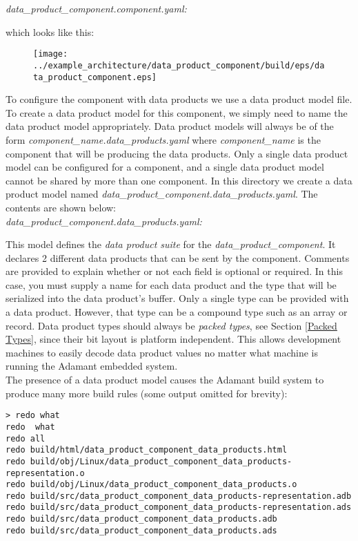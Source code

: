 \textit{data\_product\_component.component.yaml:}

which looks like this:

\begin{figure}[H]
  \texttt{[image: ../example\_architecture/data\_product\_component/build/eps/data\_product\_component.eps]}
\end{figure}

To configure the component with data products we use a data product model file. To create a data product model for this component, we simply need to name the data product model appropriately. Data product models will always be of the form \textit{component\_name.data\_products.yaml} where \textit{component\_name} is the component that will be producing the data products. Only a single data product model can be configured for a component, and a single data product model cannot be shared by more than one component. In this directory we create a data product model named \textit{data\_product\_component.data\_products.yaml}. The contents are shown below: \\

\textit{data\_product\_component.data\_products.yaml:}

This model defines the \textit{data product suite} for the \textit{data\_product\_component}. It declares 2 different data products that can be sent by the component. Comments are provided to explain whether or not each field is optional or required. In this case, you must supply a name for each data product and the type that will be serialized into the data product's buffer. Only a single type can be provided with a data product. However, that type can be a compound type such as an array or record. Data product types should always be \textit{packed types}, see Section \ref{Packed Types}, since their bit layout is platform independent. This allows development machines to easily decode data product values no matter what machine is running the Adamant embedded system. \\

The presence of a data product model causes the Adamant build system to produce many more build rules (some output omitted for brevity):

\vspace{5mm} %
\begin{verbatim}
> redo what 
redo  what
redo all
redo build/html/data_product_component_data_products.html
redo build/obj/Linux/data_product_component_data_products-representation.o
redo build/obj/Linux/data_product_component_data_products.o
redo build/src/data_product_component_data_products-representation.adb
redo build/src/data_product_component_data_products-representation.ads
redo build/src/data_product_component_data_products.adb
redo build/src/data_product_component_data_products.ads
\end{verbatim}
\vspace{5mm} %

